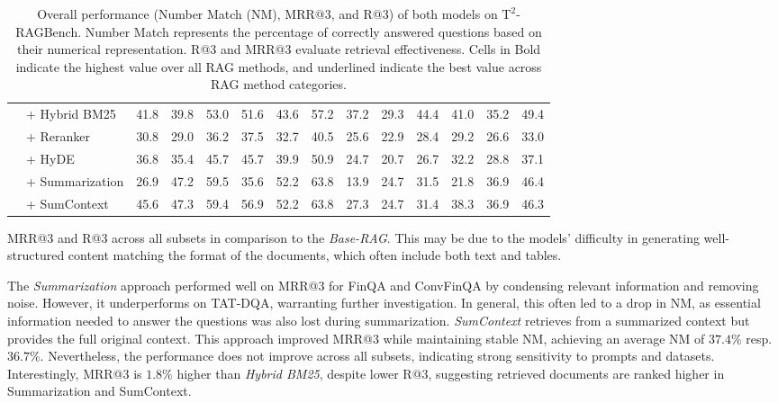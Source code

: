 \documentclass[10pt]{article}
\begin{document}
\begin{table}[h!]
\begin{tabular}{ll|ccc|ccc|ccc|ccc}
& + Hybrid BM25 & 41.8 & 39.8 & 53.0 & 51.6 & 43.6 & 57.2 & 37.2 & 29.3 & 44.4 & 41.0 & 35.2 & 49.4 \\
& + Reranker & 30.8 & 29.0 & 36.2 & 37.5 & 32.7 & 40.5 & 25.6 & 22.9 & 28.4 & 29.2 & 26.6 & 33.0 \\
& + HyDE & 36.8 & 35.4 & 45.7 & 45.7 & 39.9 & 50.9 & 24.7 & 20.7 & 26.7 & 32.2 & 28.8 & 37.1 \\
& + Summarization & 26.9 & 47.2 & 59.5 & 35.6 & 52.2 & 63.8 & 13.9 & 24.7 & 31.5 & 21.8 & 36.9 & 46.4 \\
& + SumContext & 45.6 & 47.3 & 59.4 & 56.9 & 52.2 & 63.8 & 27.3 & 24.7 & 31.4 & 38.3 & 36.9 & 46.3 \\
\bottomrule
\end{tabular}
\caption{Overall performance (Number Match (NM), MRR@3, and R@3) of both models on $\mathrm{T}^2$-RAGBench. Number Match represents the percentage of correctly answered questions based on their numerical representation. R@3 and MRR@3 evaluate retrieval effectiveness. Cells in Bold indicate the highest value over all RAG methods, and underlined indicate the best value across RAG method categories.}
\end{table}

MRR@3 and R@3 across all subsets in comparison to the \textit{Base-RAG}. This may be due to the models' difficulty in generating well-structured content matching the format of the documents, which often include both text and tables.

The \textit{Summarization} approach performed well on MRR@3 for FinQA and ConvFinQA by condensing relevant information and removing noise. However, it underperforms on TAT-DQA, warranting further investigation. In general, this often led to a drop in NM, as essential information needed to answer the questions was also lost during summarization. \textit{SumContext} retrieves from a summarized context but provides the full original context. This approach improved MRR@3 while maintaining stable NM, achieving an average NM of $37.4\%$ resp. $36.7\%$. Nevertheless, the performance does not improve across all subsets, indicating strong sensitivity to prompts and datasets. Interestingly, MRR@3 is $1.8\%$ higher than \textit{Hybrid BM25}, despite lower R@3, suggesting retrieved documents are ranked higher in Summarization and SumContext.
\end{document}
